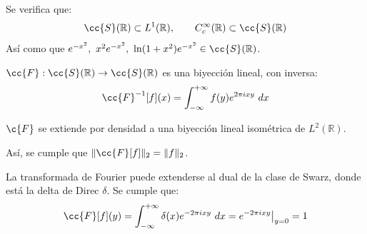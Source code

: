 \noindent
Se verifica que:
\begin{equation*}
    \cc{S}(\mathbb{R}) \subset L^1(\mathbb{R}), \qquad C_c^\infty(\mathbb{R}) \subset \cc{S}(\mathbb{R})
\end{equation*}
Así como que $e^{-x^2},\  x^2e^{-x^2},\  \ln(1+x^2)e^{-x^2}\in \cc{S}(\mathbb{R})$.

\begin{prop}
    $\cc{F}:\cc{S}(\mathbb{R})\to \cc{S}(\mathbb{R})$ es una biyección lineal, con inversa:
    \begin{equation*}
        \cc{F}^{-1}[f](x) = \int_{-\infty}^{+\infty} f(y)e^{2\pi ixy}~dx 
    \end{equation*}
\end{prop}

\begin{teo}[de Plancherel]
    $\c{F}$ se extiende por densidad a una biyección lineal isométrica de $L^2(\mathbb{R})$.

    \noindent
    Así, se cumple que $\|\cc{F}[f]\|_2 = \|f\|_2$.
\end{teo}

\noindent
La transformada de Fourier puede extenderse al dual de la clase de Swarz, donde está la delta de Direc $\delta$. Se cumple que:
\begin{equation*}
    \cc{F}[f](y) = \int_{-\infty}^{+\infty} \delta(x)e^{-2\pi ixy}~dx  = e^{-2\pi ixy}\big|_{y=0}= 1
\end{equation*}

